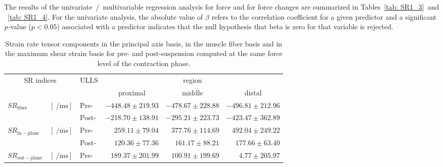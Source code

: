 The results of the univariate~/~multivariable regression analysis for force and for force changes are summarized in Tables~\ref{tab: SR1_3}~and ~\ref{tab: SR1_4}.
For the univariate analysis, the absolute value of $\beta$ refers to the correlation coefficient for a given predictor and a significant \textit{p-}value ($p < 0.05$) associated with a predictor indicates that the null hypothesis that beta is zero for that variable is rejected.
\begin{landscape}
\centering
\begin{table}[!h]
\vspace{+0.2cm}
\caption[Strain rate indices for pre- and post-suspension computed at the same force level of the contraction phase]{Strain rate tensor components in the principal axis basis, in the muscle fiber basis and in the maximum shear strain basis for pre- and post-suspension computed at the same force level of the contraction phase.}
\label{tab: SR1_2}
\begin{center}
\begin{threeparttable}
\begin{tabular}{@{}lllrrr@{}}
\toprule[1pt]\midrule[0.3pt]
\multicolumn{2}{c}{\multirow{2}{*}{SR indices}} & \multirow{2}{*}{ULLS} & \multicolumn{3}{c}{region}                         \\ \cmidrule(lr){4-6} 
\multicolumn{2}{c}{}                             &                       & \multicolumn{1}{c}{proximal} & \multicolumn{1}{c}{middle} & \multicolumn{1}{c}{distal}        \\ \cmidrule(){1-6}
\multirow{2}{*}{$SR_{\mathrm{fiber}}$}           & \multirow{2}{*}{$\left[ \SI{}{\per\milli\second}\right]$} 		& Pre-  & $-448.48 \pm 219.93$ & $-478.67 \pm 228.88$  & $-496.81 \pm 212.96$ \\
                                                 &														 	 		& Post- & $-218.70 \pm 138.91$ & $-295.21 \pm 223.73$  & $-423.47 \pm 362.89$ \\ [6pt]
\multirow{2}{*}{$SR_{\mathrm{in-plane}}$\tnote{1,2,3}}  & \multirow{2}{*}{$\left[ \SI{}{\per\milli\second}\right]$} & Pre-  & $259.11  \pm 79.04$  & $377.76  \pm 114.69$  & $492.04 \pm 249.22$  \\
                                                 &  														 			& Post- & $120.36  \pm 77.36$  & $161.17  \pm 88.21$   & $177.66 \pm 63.40$   \\ [6pt]
\multirow{2}{*}{$SR_{\mathrm{out-plane}}$\tnote{4}}     & \multirow{2}{*}{$\left[ \SI{}{\per\milli\second}\right]$} & Pre-  & $189.37  \pm 201.99$ & $100.91  \pm 199.69$  & $4.77 \pm 205.97$    \\

\end{tabular}
\end{threeparttable}
\end{center}
\end{table}
\end{landscape}
